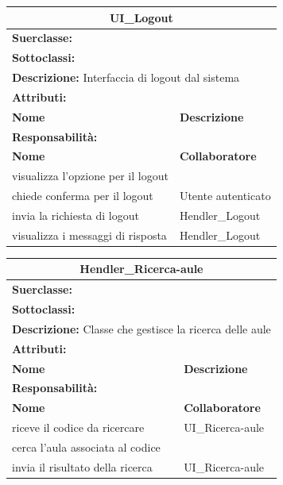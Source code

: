 \documentclass[11pt]{article}
\begin{document}
\begin{table}[H]
\centering
\begin{tabularx}{1\textwidth}{|X|X|}\hline
\multicolumn{2}{|c|}{\textbf{UI\_Logout}}\\\hline
\multicolumn{2}{|l|}{\textbf{Suerclasse:}}\\\hline
\multicolumn{2}{|l|}{\textbf{Sottoclassi:}}\\\hline
\multicolumn{2}{|l|}{\textbf{Descrizione:} Interfaccia di logout dal sistema}\\\hline
\multicolumn{2}{|l|}{\textbf{Attributi:}}\\
\textbf{Nome} & \textbf{Descrizione}\\
\hline
\multicolumn{2}{|l|}{\textbf{Responsabilità:}}\\
\textbf{Nome} & \textbf{Collaboratore}\\
visualizza l'opzione per il logout & \\
chiede conferma per il logout & Utente autenticato\\
invia la richiesta di logout & Hendler\_Logout\\
visualizza i messaggi di risposta & Hendler\_Logout\\
\hline
\end{tabularx}
\end{table}



\begin{table}[H]
\centering
\begin{tabularx}{1\textwidth}{|X|X|}\hline
\multicolumn{2}{|c|}{\textbf{Hendler\_Ricerca-aule}}\\\hline
\multicolumn{2}{|l|}{\textbf{Suerclasse:}}\\\hline
\multicolumn{2}{|l|}{\textbf{Sottoclassi:}}\\\hline
\multicolumn{2}{|l|}{\textbf{Descrizione:} Classe che gestisce la ricerca delle aule}\\\hline
\multicolumn{2}{|l|}{\textbf{Attributi:}}\\
\textbf{Nome} & \textbf{Descrizione}\\
\hline
\multicolumn{2}{|l|}{\textbf{Responsabilità:}}\\
\textbf{Nome} & \textbf{Collaboratore}\\
riceve il codice da ricercare & UI\_Ricerca-aule\\ 
cerca l'aula associata al codice &\\
invia il risultato della ricerca & UI\_Ricerca-aule\\
\hline
\end{tabularx}
\end{table}
\end{document}
